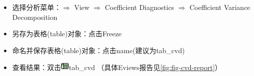 \documentclass[12pt,(landscape,a4paper),(portrait,a4paper)]{article}
\providecommand{\tightlist}{%
  \setlength{\itemsep}{0pt}\setlength{\parskip}{0pt}}
\begin{document}
\begin{itemize}
\begin{enumerate}
    \begin{itemize}
    \tightlist
    \item
      选择分析菜单：\(\Rightarrow\) View \(\Rightarrow\) Coefficient
      Diagnostics \(\Rightarrow\) Coefficient Variance Decomposition
    \item
      另存为表格(table)对象：点击Freeze
    \item
      命名并保存表格(table)对象：点击name(建议为tab\_cvd)
    \item
      查看结果：双击\includegraphics{picture/object/Table.png}tab\_cvd
      （具体Eviews报告见\ref{fig:fig-cvd-report}）
    \end{itemize}
  \end{enumerate}
\end{itemize}
\end{document}
